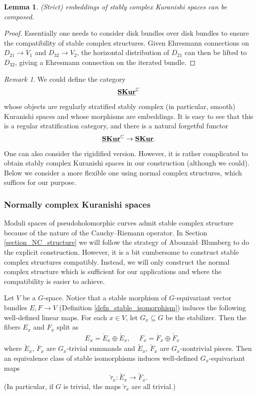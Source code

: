 \documentclass[reqno, 10pt]{amsart}
\numberwithin{equation}{section}
\numberwithin{equation}{section}
\renewcommand{\subset}{\subseteq}
\newtheorem{lemma}[thm]{Lemma}
\theoremstyle{definition}
\theoremstyle{remark}
\newtheorem{rem}[thm]{Remark}
\newcommand{\beqn}{\begin{equation*}}
\newcommand{\eeqn}{\end{equation*}}
\newcommand{\mb}{\mathbb}
\newcommand{\uds}[1]{\underline{\smash{#1}}}
\begin{document}
\begin{lemma}
(Strict) embeddings of stably complex Kuranishi spaces can be composed.
\end{lemma}

\begin{proof}
Essentially one needs to consider disk bundles over disk bundles to ensure the compatibility of stable complex structures. Given Ehresmann connections on $D_{21}\to V_1$ and $D_{32} \to V_2$, the horizontal distribution of $D_{21}$ can then be lifted to $D_{32}$, giving a Ehresmann connection on the iterated bundle.
\end{proof}

\begin{rem}
We could define the category 
\beqn
\uds{\bf SKur}^{\mb C}
\eeqn
whose objects are regularly stratified stably complex (in particular, smooth) Kuranishi spaces  and whose morphisms are embeddings. It is easy to see that this is a regular stratification category, and there is a natural forgetful functor
\beqn
\uds{\bf SKur}^{\mb C} \to \uds{\bf SKur}.
\eeqn
One can also consider the rigidified version. However, it is rather complicated to obtain stably complex Kuranishi spaces in our construction (although we could). Below we consider a more flexible one using normal complex structures, which suffices for our purpose.
\end{rem}




\subsubsection{Normally complex Kuranishi spaces}

Moduli spaces of pseudoholomorphic curves admit stable complex structure because of the nature of the Cauchy--Riemann operator. In Section \ref{section_NC_structure} we will follow the strategy of Abouzaid--Blumberg \cite{Abouzaid_Blumberg, Abouzaid_Blumberg_2024} to do the explicit construction. However, it is a bit cumbersome to construct stable complex structures compatibly. Instead, we will only construct the normal complex structure which is sufficient for our applications and where the compatibility is easier to achieve. 

Let $V$ be a $G$-space. Notice that a stable morphism of $G$-equivariant vector bundles $E, F \to V$ (Definition \ref{defn_stable_isomorphism}) induces the following well-defined linear maps. For each $x \in V$, let $G_x \subset G$ be the stabilizer. Then the fibers $E_x$ and $F_x$ split as 
\begin{align*}
&\ E_x = \mathring E_x \oplus \check E_x,\ &\ F_x = \mathring F_x \oplus \check F_x
\end{align*}
where $\mathring E_x$, $\mathring F_x$ are $G_x$-trivial summands and $\check E_x$, $\check F_x$ are $G_x$-nontrivial pieces. Then an equivalence class of stable isomorphisms induces well-defined $G_x$-equivariant maps
\beqn
\check \tau_x: \check E_x \to \check F_x.
\eeqn
(In particular, if $G$ is trivial, the maps $\check \tau_x$ are all trivial.)
\end{document}
